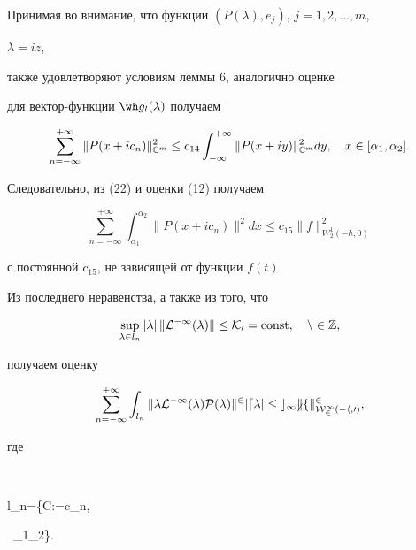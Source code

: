  


Принимая во внимание, что функции $(P(\lambda),e_j)$, $j=1,2,\dotsc,m$, 


$\lambda=i{}z$, 


также удовлетворяют условиям леммы 6, аналогично оценке 


для вектор-функции $\wh g_l(\lambda)$ получаем 


\begin{equation} 


\sum^{+\infty}_{n=-\infty}\|P(x+i c_n)\|^2_{\Bbb C^m}\le c_{14} 


\int^{+\infty}_{-\infty}\|P(x+i y)\|^2_{\Bbb C^m}dy,\quad 


x\in[\alpha_1,\alpha_2]. 


\end{equation} 


Следовательно, из (22) и оценки (12) получаем 


$$ 


\sum^{+\infty}_{n=-\infty}\int^{\alpha_2}_{\alpha_1} 


\|P(x+i c_n)\|^2dx\le c_{15} 


\|f\|^2_{W^1_2(-h,0)} 


$$ 


с постоянной $c_{15}$, не зависящей от функции $f(t)$. 


 


Из последнего неравенства, а также из того, что 


$$ 


\sup_{\lambda\in l_n}|\lambda|\,\|\cal L^{-1}(\lambda)\| 


\le K_0=\const,\quad n\in \Bbb Z, 


$$ 


получаем оценку 


\begin{equation} 


\sum^{+\infty}_{n=-\infty}\int_{l_n}\|\lambda\cal L^{-1} 


(\lambda)P(\lambda)\|^2|d\lambda|\le c_{16} 


\|f\|^2_{W^1_2(-h,0)}, 


\end{equation} 


где 


$$ 


l_n=\{\lambda\in\Bbb C:\im\lambda=c_n, 


\ \alpha_1\le\re\lambda\le\alpha_2\}. 



